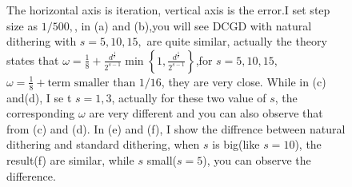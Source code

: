 \documentclass[12pt,a4paper]{article}
\begin{document}
\begin{figure}
		
		
		\caption{  The horizontal axis is iteration, vertical axis is the error.I set step  size as $1/500,$, in (a) and (b),you will see DCGD with natural dithering with $s = 5, 10, 15,$ are quite similar, actually the theory states that $\omega=\frac{1}{8}+\frac{d^{\frac{1}{r}}}{2^{s-1}} \min \left\{1, \frac{d^{\frac{1}{r}}}{2^{s-1}}\right\}$,for $s=5, 10, 15$, $\omega= \frac{1}{8}+ \text{term smaller than 1/16}$, they are very close. While in (c) and(d), I se t $s= 1,3$, actually for these two value of $s$, the corresponding $\omega$ are very different and you can also observe that from (c) and (d). In (e) and (f), I show the diffrence between natural dithering and standard dithering, when $s$ is big(like $s = 10$), the result(f) are similar, while $s$ small($s=5 $), you can observe the difference.} %
		\label{img2}
	\end{figure}
	
	
	
\end{document}
